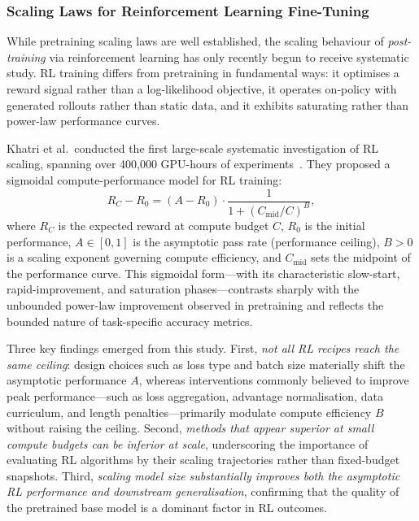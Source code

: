 \subsubsection{Scaling Laws for Reinforcement Learning Fine-Tuning}

While pretraining scaling laws are well established, the scaling behaviour of
\emph{post-training} via reinforcement learning has only recently begun to
receive systematic study.  RL training differs from pretraining in fundamental
ways: it optimises a reward signal rather than a log-likelihood objective, it
operates on-policy with generated rollouts rather than static data, and it
exhibits saturating rather than power-law performance curves.

Khatri et al.\ conducted the first large-scale systematic investigation of RL
scaling, spanning over 400,000 GPU-hours of
experiments~\cite{khatri2025scaling}.  They proposed a sigmoidal
compute-performance model for RL training:
\begin{equation}
  R_C - R_0 = (A - R_0) \cdot \frac{1}{1 + (C_{\text{mid}} / C)^B},
  \label{eq:rl-sigmoid}
\end{equation}
where $R_C$ is the expected reward at compute budget $C$, $R_0$ is the initial
performance, $A \in [0,1]$ is the asymptotic pass rate (performance ceiling),
$B > 0$ is a scaling exponent governing compute efficiency, and $C_{\text{mid}}$
sets the midpoint of the performance curve.  This sigmoidal form---with its
characteristic slow-start, rapid-improvement, and saturation phases---contrasts
sharply with the unbounded power-law improvement observed in pretraining and
reflects the bounded nature of task-specific accuracy metrics.

Three key findings emerged from this study.  First, \emph{not all RL recipes
reach the same ceiling}: design choices such as loss type and batch size
materially shift the asymptotic performance $A$, whereas interventions commonly
believed to improve peak performance---such as loss aggregation, advantage
normalisation, data curriculum, and length penalties---primarily modulate compute
efficiency $B$ without raising the ceiling.  Second, \emph{methods that appear
superior at small compute budgets can be inferior at scale}, underscoring the
importance of evaluating RL algorithms by their scaling trajectories rather than
fixed-budget snapshots.  Third, \emph{scaling model size substantially improves
both the asymptotic RL performance and downstream generalisation}, confirming
that the quality of the pretrained base model is a dominant factor in RL
outcomes.

